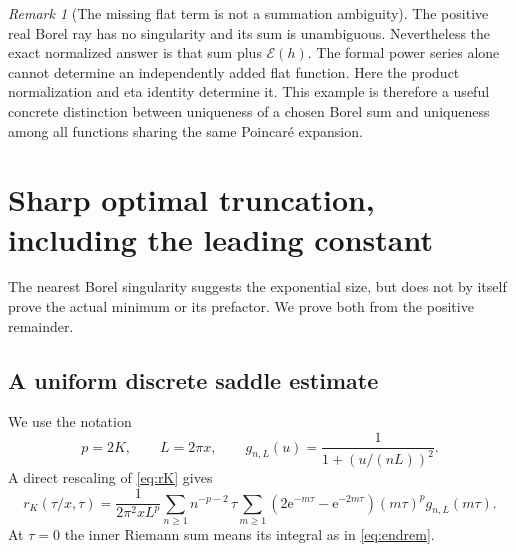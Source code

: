 \documentclass[11pt,a4paper]{article}
\theoremstyle{definition}
\theoremstyle{remark}
\newtheorem{remark}[theorem]{Remark}
\newcommand{\e}{\mathrm e}
\newcommand{\Ecal}{\mathcal E}
\begin{document}
\begin{remark}[The missing flat term is not a summation ambiguity]
The positive real Borel ray has no singularity and its sum is unambiguous.
Nevertheless the exact normalized answer is that sum plus $\Ecal(h)$.
The formal power series alone cannot determine an independently added
flat function. Here the product normalization and eta identity determine
it. This example is therefore a useful concrete distinction between
uniqueness of a chosen Borel sum and uniqueness among all functions sharing
the same Poincar\'e expansion.
\end{remark}

\section{Sharp optimal truncation, including the leading constant}
\label{sec:optimal}
The nearest Borel singularity suggests the exponential size, but does not
by itself prove the actual minimum or its prefactor. We prove both from
the positive remainder.

\subsection{A uniform discrete saddle estimate}
We use the notation
\begin{equation}
 p=2K,\qquad L=2\pi x,\qquad
 g_{n,L}(u)=\frac1{1+(u/(nL))^2}.
 \label{eq:pL}
\end{equation}
A direct rescaling of \eqref{eq:rK} gives
\begin{equation}
 r_K(\tau/x,\tau)=\frac1{2\pi^2xL^p}
 \sum_{n\ge1}n^{-p-2}\,
 \tau\sum_{m\ge1}
 (2\e^{-m\tau}-\e^{-2m\tau})(m\tau)^p g_{n,L}(m\tau).
 \label{eq:rescaledr}
\end{equation}
At $\tau=0$ the inner Riemann sum means its integral as in
\eqref{eq:endrem}.
\end{document}
